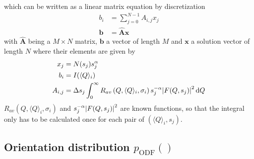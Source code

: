 which can be written as a linear matrix equation by discretization
\begin{align}
\label{eq:discreteFredholm}
b_i &= \sum_{j=0}^{N-1} A_{i,j} x_j \\
\label{eq:discreteFredholmVector}
\mathbf{b} &= \hat{\mathbf{A}}\mathbf{x}
\end{align}
with $\hat{\mathbf{A}}$ being a $M\times N$ matrix, $\mathbf{b}$ a vector of length $M$ and $\mathbf{x}$ a solution vector of length $N$ where their elements are given by
\begin{align}
x_j &= N(s_j) s_j^{\alpha}\\
b_i &= I(\langle Q\rangle_i) \\
A_{i,j} &= \Delta s_j \int_0^\infty R_{av}\left(Q,\langle Q\rangle_i,\sigma_i\right) s_j^{-\alpha} \abs{F(Q,s_j)}^2 \, \mathrm{d}Q  \label{eq:AijFF}
\end{align}
$R_{av}\left(Q,\langle Q\rangle_i,\sigma_i\right)$ and $s_j^{-\alpha}\abs{F(Q,s_j)}^2$ are known functions, so that the integral only has to be calculated once for each pair of $(\langle Q\rangle_i,s_j)$.

\subsection{Orientation distribution $p_\mathrm{ODF}()$} ~\\
\label{sec:pODF}

